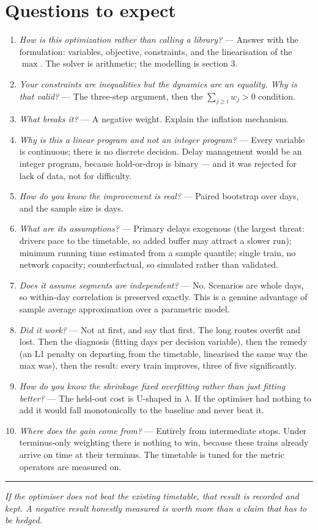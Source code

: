 \documentclass[11pt,a4paper]{article}
\begin{document}
\section{Questions to expect}

\begin{enumerate}[leftmargin=1.5em,itemsep=0.3em]
  \item \emph{How is this optimization rather than calling a library?} --- Answer with the
        formulation: variables, objective, constraints, and the linearisation of the $\max$.
        The solver is arithmetic; the modelling is section 3.
  \item \emph{Your constraints are inequalities but the dynamics are an equality. Why is
        that valid?} --- The three-step argument, then the $\sum_{j\ge i} w_j > 0$ condition.
  \item \emph{What breaks it?} --- A negative weight. Explain the inflation mechanism.
  \item \emph{Why is this a linear program and not an integer program?} --- Every variable is
        continuous; there is no discrete decision. Delay management would be an integer
        program, because hold-or-drop is binary --- and it was rejected for lack of data,
        not for difficulty.
  \item \emph{How do you know the improvement is real?} --- Paired bootstrap over days, and
        the sample size is days.
  \item \emph{What are its assumptions?} --- Primary delays exogenous (the largest threat:
        drivers pace to the timetable, so added buffer may attract a slower run); minimum
        running time estimated from a sample quantile; single train, no network capacity;
        counterfactual, so simulated rather than validated.
  \item \emph{Does it assume segments are independent?} --- No. Scenarios are whole days, so
        within-day correlation is preserved exactly. This is a genuine advantage of sample
        average approximation over a parametric model.
  \item \emph{Did it work?} --- Not at first, and say that first. The long routes overfit and
        lost. Then the diagnosis (fitting days per decision variable), then the remedy (an L1
        penalty on departing from the timetable, linearised the same way the max was), then
        the result: every train improves, three of five significantly.
  \item \emph{How do you know the shrinkage fixed overfitting rather than just fitting
        better?} --- The held-out cost is U-shaped in $\lambda$. If the optimiser had nothing
        to add it would fall monotonically to the baseline and never beat it.
  \item \emph{Where does the gain come from?} --- Entirely from intermediate stops. Under
        terminus-only weighting there is nothing to win, because these trains already arrive
        on time at their terminus. The timetable is tuned for the metric operators are
        measured on.
\end{enumerate}

\vspace{0.8em}
\hrule
\vspace{0.5em}
\noindent\small\textit{If the optimiser does not beat the existing timetable, that result is
recorded and kept. A negative result honestly measured is worth more than a claim that has
to be hedged.}
\end{document}
